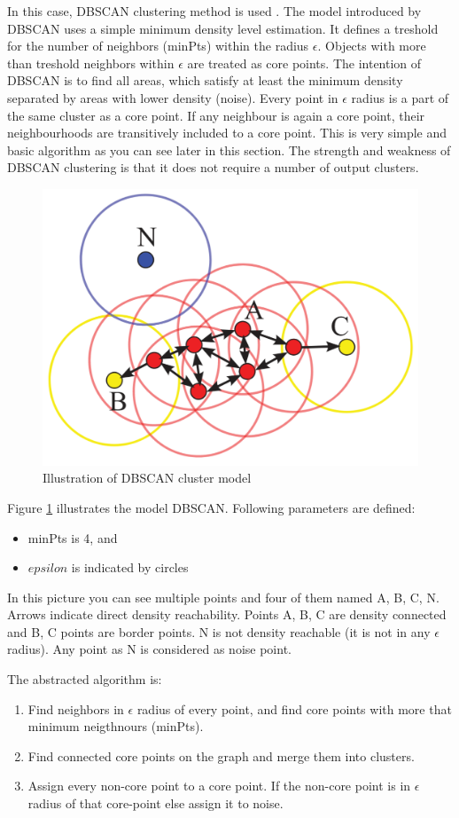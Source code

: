 	In this case, DBSCAN clustering method is used
	\cite{Schubert:2017:DRR:3129336.3068335}. The model introduced by DBSCAN uses
	a simple minimum density level estimation. It defines a treshold for the
	number of neighbors (minPts) within the radius $\epsilon$. Objects with more
	than treshold neighbors within $\epsilon$ are treated as core points. The
	intention of DBSCAN is to find all areas, which satisfy at least the minimum
	density separated by areas with lower density (noise). Every point in
	$\epsilon$ radius is a part of the same cluster as a core point. If any
	neighbour is again a core point, their neighbourhoods are transitively
	included to a core point. This is very simple and basic algorithm as you can
	see later in this section. The strength and weakness of DBSCAN clustering is
	that it does not require a number of output clusters.

	\begin{figure}[h]
		\centering
		\includegraphics[width=0.5\linewidth]{obrazky-figures/dbscan}
		\caption{Illustration of DBSCAN cluster model}
		\label{dbscan_ilustration}
	\end{figure}

	Figure \ref{dbscan_ilustration} illustrates the model DBSCAN.
	Following parameters are defined:
	\begin{itemize}
			\item minPts is 4, and
			\item $epsilon$ is indicated by circles
	\end{itemize}

	In this picture you can see multiple points and four of them named A, B, C, N.
	Arrows indicate direct density reachability. Points A, B, C are density connected and B, C points are border points.
	N is not density reachable (it is not in any $\epsilon$ radius). Any point as N is considered as noise point.

	The abstracted algorithm is:\nopagebreak
	\begin{enumerate}
			\item Find neighbors in $\epsilon$ radius of every point, and find core
			points with more that minimum neigthnours (minPts).
			\item Find connected core points on the graph and merge them into clusters.
			\item Assign every non-core point to a core point. If the non-core point
			is in $\epsilon$ radius of that core-point else assign it to noise.
	\end{enumerate}

